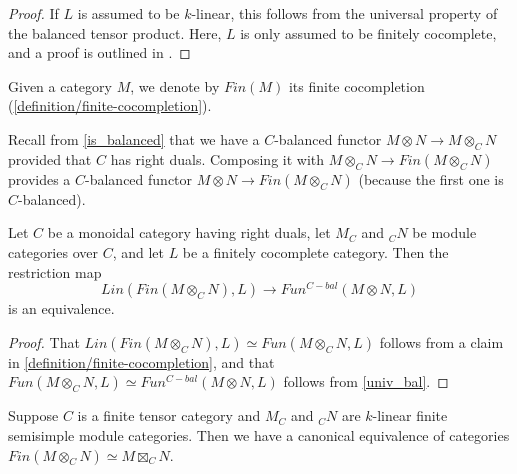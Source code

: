 \begin{proof}
  If $L$ is assumed to be $k$-linear, this follows from the universal property
  of the balanced tensor product. Here, $L$ is only assumed to be finitely
  cocomplete, and a proof is outlined in \cite[Remark 3.4]{douglas/balanced-product}.
\end{proof}

\begin{notation}
  Given a category $M$, we denote by $Fin(M)$ its finite cocompletion
  (\ref{definition/finite-cocompletion}).
\end{notation}

\noindent Recall from \ref{is_balanced} that we have a $C$-balanced functor $M
\otimes N \to M\otimes_C N$ provided that $C$ has right duals. Composing it
with $M\otimes_C N \to Fin(M\otimes_C N)$ provides a $C$-balanced functor
$M\otimes N\to Fin(M\otimes_C N)$ (because the first one is $C$-balanced).

\begin{lemma}\label{univ_finbal}

  \noindent Let $C$ be a monoidal category having right duals, let $M_C$ and $_{C}N$ be
  module categories over $C$, and let $L$ be a finitely cocomplete category.
  Then the restriction map $$Lin(Fin(M\otimes_C N),L)\to Fun^{C-bal}(M\otimes
  N,L)$$ is an equivalence.
\end{lemma}

\begin{proof}
  That $Lin(Fin(M\otimes_C N),L) \simeq Fun(M \otimes_{C} N, L)$ follows from
  a claim in \ref{definition/finite-cocompletion}, and that $Fun(M \otimes_{C}
  N, L) \simeq Fun^{C-bal}(M \otimes N, L)$ follows from \ref{univ_bal}.
\end{proof}

\begin{proposition}\label{fin_eq_bal}

  \noindent Suppose $C$ is a finite tensor category and $M_C$ and $_{C}N$ are $k$-linear
  finite semisimple module categories. Then we have a canonical equivalence of
  categories $Fin(M\otimes_C N) \simeq M\boxtimes_C N$.
\end{proposition}

